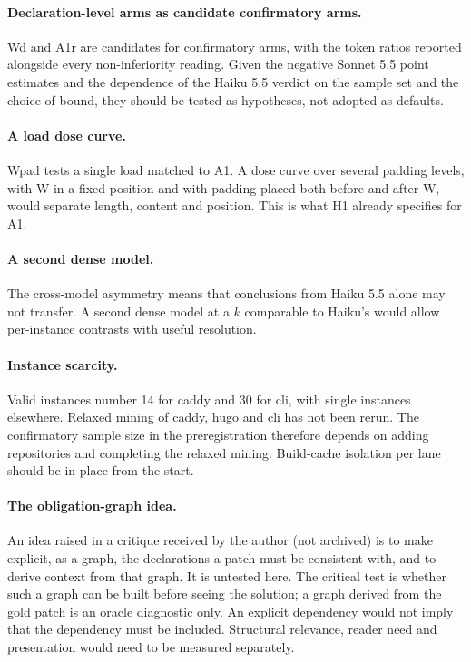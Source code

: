 \paragraph{Declaration-level arms as candidate confirmatory arms.} Wd and A1r are candidates for confirmatory arms, with the token ratios reported alongside every non-inferiority reading. Given the negative Sonnet 5.5 point estimates and the dependence of the Haiku 5.5 verdict on the sample set and the choice of bound, they should be tested as hypotheses, not adopted as defaults.

\paragraph{A load dose curve.} Wpad tests a single load matched to A1. A dose curve over several padding levels, with W in a fixed position and with padding placed both before and after W, would separate length, content and position. This is what H1 already specifies for A1.

\paragraph{A second dense model.} The cross-model asymmetry means that conclusions from Haiku 5.5 alone may not transfer. A second dense model at a $k$ comparable to Haiku's would allow per-instance contrasts with useful resolution.

\paragraph{Instance scarcity.} Valid instances number 14 for caddy and 30 for cli, with single instances elsewhere. Relaxed mining of caddy, hugo and cli has not been rerun. The confirmatory sample size in the preregistration therefore depends on adding repositories and completing the relaxed mining. Build-cache isolation per lane should be in place from the start.

\paragraph{The obligation-graph idea.} An idea raised in a critique received by the author (not archived) is to make explicit, as a graph, the declarations a patch must be consistent with, and to derive context from that graph. It is untested here. The critical test is whether such a graph can be built before seeing the solution; a graph derived from the gold patch is an oracle diagnostic only. An explicit dependency would not imply that the dependency must be included. Structural relevance, reader need and presentation would need to be measured separately.

